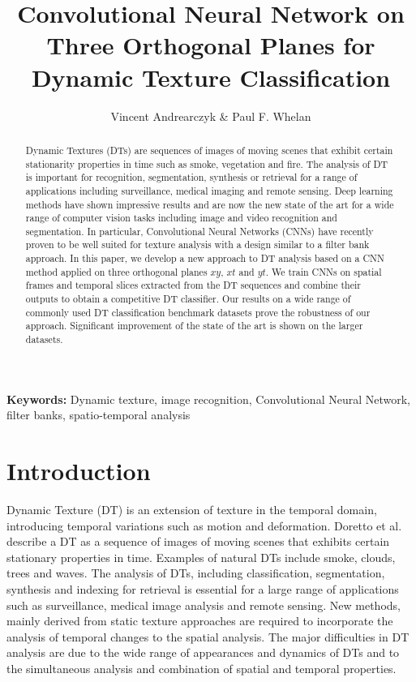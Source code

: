 \documentclass[a4paper,11pt]{article}
\begin{document}
\title{Convolutional Neural Network on Three Orthogonal Planes for Dynamic Texture Classification}

\author{Vincent Andrearczyk \& Paul F. Whelan}
\date{}
\maketitle
\thispagestyle{empty}


\vspace{-35pt}
\begin{abstract}

Dynamic Textures (DTs) are sequences of images of moving scenes that exhibit certain stationarity properties in time such as smoke, vegetation and fire.
The analysis of DT is important for recognition, segmentation, synthesis or retrieval for a range of applications including surveillance, medical
imaging and remote sensing. 
Deep learning methods have shown impressive results and are now the new state of the art for a wide range of computer vision tasks including image and video recognition and segmentation. 
In particular, Convolutional Neural Networks (CNNs) have recently proven to be well suited  for texture analysis with a design similar to a filter bank approach.
In this paper, we develop a new approach to DT analysis based on a CNN method applied on three orthogonal planes $xy$, $xt$ and $yt$.
We train CNNs on spatial frames and temporal slices extracted from the DT sequences and combine their outputs to obtain a competitive DT classifier.
Our results on a wide range of commonly used DT classification benchmark datasets prove the robustness of our approach. Significant improvement of the state of the art is shown on the larger datasets.
\end{abstract}
\textbf{Keywords:} Dynamic texture, image recognition, Convolutional Neural Network, filter banks, spatio-temporal analysis


\section{Introduction}
Dynamic Texture (DT) is an extension of texture in the temporal domain, introducing temporal variations such as motion and deformation.
Doretto et al. \cite{doretto2003dynamic} describe a DT as a sequence of images of moving scenes that exhibits certain stationary properties in time.
Examples of natural DTs include smoke, clouds, trees and waves. The analysis of DTs, including classification, segmentation,
synthesis and indexing for retrieval is essential for a large range of applications such as surveillance, medical image analysis and remote sensing.
New methods, mainly derived from static texture approaches are required to incorporate the analysis of temporal changes to the spatial analysis.
The major difficulties in DT analysis are due to the wide range of appearances and dynamics of DTs and to the simultaneous analysis and
combination of spatial and temporal properties.
\end{document}
